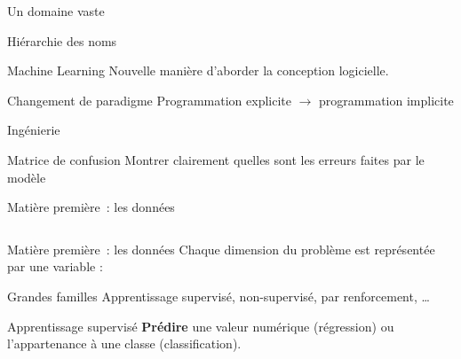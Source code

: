 \begin{frame}{Un domaine vaste}
\end{frame}

\begin{frame}{Hiérarchie des noms}
\end{frame}

\begin{frame}{Machine Learning}
  Nouvelle manière d'aborder la conception logicielle.
  \vfill
  \begin{block}{Changement de paradigme}
  Programmation explicite $\rightarrow$ programmation implicite
  \end{block}
\end{frame}

\begin{frame}{Ingénierie}
\end{frame}

\begin{frame}{Matrice de confusion}
  Montrer clairement quelles sont les erreurs faites par le modèle
\end{frame}

\begin{frame}{Matière première~: les données}
  \begin{columns}
    \begin{column}{.48\textwidth}
    \end{column}
    \begin{column}{.52\textwidth}
    \end{column}
  \end{columns}
\end{frame}

\begin{frame}{Matière première~: les données}
  Chaque dimension du problème est représentée par une variable : 
\end{frame}

\begin{frame}{Grandes familles}
  Apprentissage supervisé, non-supervisé, par renforcement, …
\end{frame}

\begin{frame}{Apprentissage supervisé}
  \textbf{Prédire} une valeur numérique (régression) ou l'appartenance à une classe (classification).
\end{frame}

